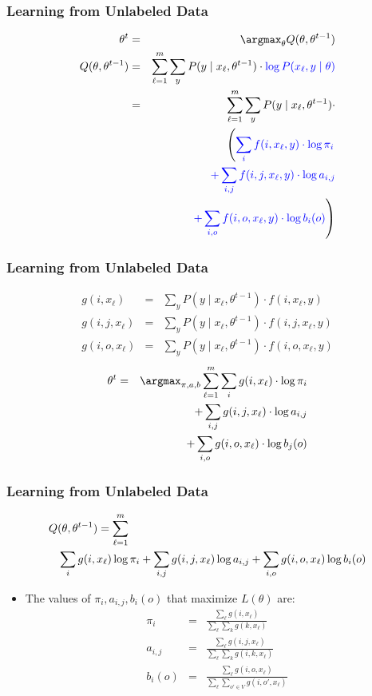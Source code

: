 \begin{frame}
\frametitle{Learning from Unlabeled Data}
\begin{eqnarray*}
\theta^t &=& \argmax_\theta Q(\theta, \theta^{t-1})\\
Q(\theta, \theta^{t-1}) &=& \sum_{\ell=1}^m \sum_y P(y \mid x_\ell, \theta^{t-1}) \cdot {\color{blue} \log P(x_\ell, y \mid \theta)} \\
&=& \sum_{\ell=1}^m \sum_y P(y \mid x_\ell, \theta^{t-1}) \cdot \\
&& \left( {\color{blue}  \sum_i f(i, x_\ell, y) \cdot \log \pi_i } \right. \\
&& {\color{blue} + \sum_{i,j} f(i,j,x_\ell,y) \cdot \log a_{i,j} } \\
&& \left. {\color{blue} + \sum_{i,o} f(i,o,x_\ell,y) \cdot \log b_i(o) } \right)
\end{eqnarray*}
\end{frame}

\begin{frame}
\frametitle{Learning from Unlabeled Data}
\begin{eqnarray*}
g(i,x_\ell) &=& \sum_y P(y \mid x_\ell, \theta^{t-1}) \cdot f(i, x_\ell, y) \\
g(i,j,x_\ell) &=& \sum_y P(y \mid x_\ell, \theta^{t-1}) \cdot f(i, j, x_\ell, y) \\
g(i,o,x_\ell) &=& \sum_y P(y \mid x_\ell, \theta^{t-1}) \cdot f(i, o, x_\ell, y)
\end{eqnarray*}
\begin{eqnarray*}
\theta^t & = & \argmax_{\pi,a,b} \sum_{\ell=1}^m \sum_i g(i,x_\ell) \cdot \log \pi_i \\
&& + \sum_{i,j} g(i,j,x_\ell) \cdot \log a_{i,j} \\
&& + \sum_{i,o} g(i,o,x_\ell) \cdot \log b_j(o)
\end{eqnarray*}
\end{frame}

\begin{frame}
\frametitle{Learning from Unlabeled Data}
{\small\begin{eqnarray*}
\lefteqn{Q(\theta,\theta^{t-1}) = \sum_{\ell=1}^m  } \\
&& \sum_i g(i,x_\ell) \log \pi_i + \sum_{i,j} g(i,j,x_\ell) \log a_{i,j} + \sum_{i,o} g(i,o,x_\ell) \log b_i(o) \end{eqnarray*}}
\begin{itemize}[<+->]
\item The values of $\pi_i, a_{i,j}, b_i(o)$ that maximize $L(\theta)$ are:
\begin{eqnarray*}
\pi_i & = & \frac{\sum_\ell g(i,x_\ell)}{\sum_\ell \sum_k g(k,x_\ell)} \\
a_{i,j} & = & \frac{\sum_\ell g(i,j,x_\ell)}{\sum_\ell \sum_k g(i,k,x_\ell)} \\
b_i(o) & = & \frac{\sum_\ell g(i,o,x_\ell)}{\sum_\ell \sum_{o' \in V} g(i,o',x_\ell)} 
\end{eqnarray*}
\end{itemize}
\end{frame}

